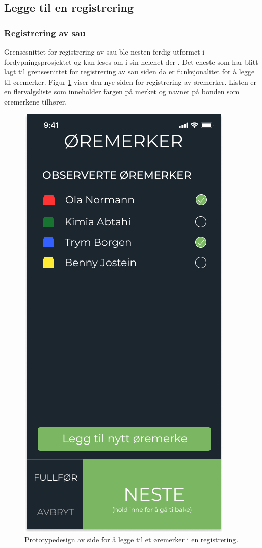 \subsection{Legge til en registrering}
\subsubsection{Registrering av sau} 
\label{subsubsec:registrering av sau}
Grensesnittet for registrering av sau ble nesten ferdig utformet i fordypningsprosjektet og kan leses om i sin helehet der \cite{Abtahi2020TilsynBeite}. Det eneste som har blitt lagt til grensesnittet for registrering av sau siden da er funksjonalitet for å legge til øremerker. Figur \ref{fig:figma-legge-til-oremerker} viser den nye siden for registrering av øremerker. Listen er en flervalgsliste som inneholder fargen på merket og navnet på bonden som øremerkene tilhører.
\begin{figure}[H]
\centering
\captionsetup{width=.8\linewidth}
\includegraphics[scale=0.4]{Figurer/Figma/Frame 2.2.2 - oremerker.png}
\caption{Prototypedesign av side for å legge til et øremerker i en registrering.}
\label{fig:figma-legge-til-oremerker}
\end{figure}
